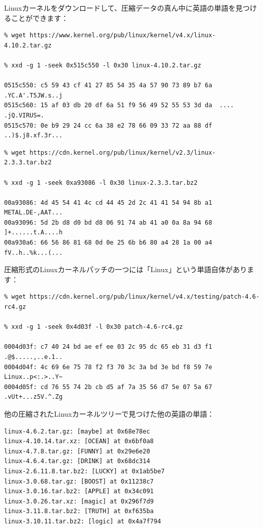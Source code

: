 
Linuxカーネルをダウンロードして、圧縮データの真ん中に英語の単語を見つけることができます：

\begin{lstlisting}
% wget https://www.kernel.org/pub/linux/kernel/v4.x/linux-4.10.2.tar.gz

% xxd -g 1 -seek 0x515c550 -l 0x30 linux-4.10.2.tar.gz

0515c550: c5 59 43 cf 41 27 85 54 35 4a 57 90 73 89 b7 6a  .YC.A'.T5JW.s..j
0515c560: 15 af 03 db 20 df 6a 51 f9 56 49 52 55 53 3d da  .... .jQ.VIRUS=.
0515c570: 0e b9 29 24 cc 6a 38 e2 78 66 09 33 72 aa 88 df  ..)$.j8.xf.3r...
\end{lstlisting}

\begin{lstlisting}
% wget https://cdn.kernel.org/pub/linux/kernel/v2.3/linux-2.3.3.tar.bz2

% xxd -g 1 -seek 0xa93086 -l 0x30 linux-2.3.3.tar.bz2

00a93086: 4d 45 54 41 4c cd 44 45 2d 2c 41 41 54 94 8b a1  METAL.DE-,AAT...
00a93096: 5d 2b d8 d0 bd d8 06 91 74 ab 41 a0 0a 8a 94 68  ]+......t.A....h
00a930a6: 66 56 86 81 68 0d 0e 25 6b b6 80 a4 28 1a 00 a4  fV..h..%k...(...
\end{lstlisting}

圧縮形式のLinuxカーネルパッチの一つには「Linux」という単語自体があります：

\begin{lstlisting}
% wget https://cdn.kernel.org/pub/linux/kernel/v4.x/testing/patch-4.6-rc4.gz

% xxd -g 1 -seek 0x4d03f -l 0x30 patch-4.6-rc4.gz

0004d03f: c7 40 24 bd ae ef ee 03 2c 95 dc 65 eb 31 d3 f1  .@$.....,..e.1..
0004d04f: 4c 69 6e 75 78 f2 f3 70 3c 3a bd 3e bd f8 59 7e  Linux..p<:.>..Y~
0004d05f: cd 76 55 74 2b cb d5 af 7a 35 56 d7 5e 07 5a 67  .vUt+...z5V.^.Zg
\end{lstlisting}

他の圧縮されたLinuxカーネルツリーで見つけた他の英語の単語：

\begin{lstlisting}
linux-4.6.2.tar.gz: [maybe] at 0x68e78ec
linux-4.10.14.tar.xz: [OCEAN] at 0x6bf0a8
linux-4.7.8.tar.gz: [FUNNY] at 0x29e6e20
linux-4.6.4.tar.gz: [DRINK] at 0x68dc314
linux-2.6.11.8.tar.bz2: [LUCKY] at 0x1ab5be7
linux-3.0.68.tar.gz: [BOOST] at 0x11238c7
linux-3.0.16.tar.bz2: [APPLE] at 0x34c091
linux-3.0.26.tar.xz: [magic] at 0x296f7d9
linux-3.11.8.tar.bz2: [TRUTH] at 0xf635ba
linux-3.10.11.tar.bz2: [logic] at 0x4a7f794
\end{lstlisting}


